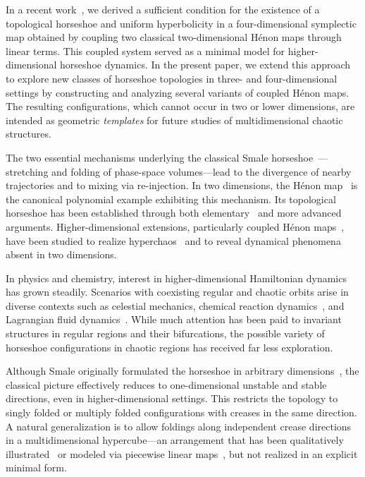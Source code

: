\documentclass[12pt]{iopart}
\begin{document}
In a recent work~\cite{Fujioka25}, we derived a sufficient condition for the existence of a topological horseshoe and uniform hyperbolicity in a four-dimensional symplectic map obtained by coupling two classical two-dimensional H\'{e}non maps through linear terms. This coupled system served as a minimal model for higher-dimensional horseshoe dynamics. In the present paper, we extend this approach to explore new classes of horseshoe topologies in three- and four-dimensional settings by constructing and analyzing several variants of coupled H\'{e}non maps. The resulting configurations, which cannot occur in two or lower dimensions, are intended as geometric \emph{templates} for future studies of multidimensional chaotic structures.

The two essential mechanisms underlying the classical Smale horseshoe~\cite{Smale65}—stretching and folding of phase-space volumes—lead to the divergence of nearby trajectories and to mixing via re-injection. In two dimensions, the H\'{e}non map~\cite{Henon76} is the canonical polynomial example exhibiting this mechanism. Its topological horseshoe has been established through both elementary~\cite{Devaney79} and more advanced~\cite{bedford2004real} arguments. Higher-dimensional extensions, particularly coupled H\'{e}non maps~\cite{mao1988standard,baier1990maximum,ding1990algebraic,todesco1994analysis,astakhov2001multistability,anastassiou2018recent,backer2020elliptic}, have been studied to realize hyperchaos~\cite{rossler1979equation} and to reveal dynamical phenomena absent in two dimensions.

In physics and chemistry, interest in higher-dimensional Hamiltonian dynamics has grown steadily. Scenarios with coexisting regular and chaotic orbits arise in diverse contexts such as celestial mechanics, chemical reaction dynamics~\cite{contopoulos2002order,laskar1994large,wiggins1994normally}, and Lagrangian fluid dynamics~\cite{wiggins2005dynamical}. While much attention has been paid to invariant structures in regular regions and their bifurcations, the possible variety of horseshoe configurations in chaotic regions has received far less exploration.

Although Smale originally formulated the horseshoe in arbitrary dimensions~\cite{Smale67}, the classical picture effectively reduces to one-dimensional unstable and stable directions, even in higher-dimensional settings. This restricts the topology to singly folded or multiply folded configurations with creases in the same direction. A natural generalization is to allow foldings along independent crease directions in a multidimensional hypercube—an arrangement that has been qualitatively illustrated~\cite{Wiggins88} or modeled via piecewise linear maps~\cite{zhang2019chaotic}, but not realized in an explicit minimal form.
\end{document}
